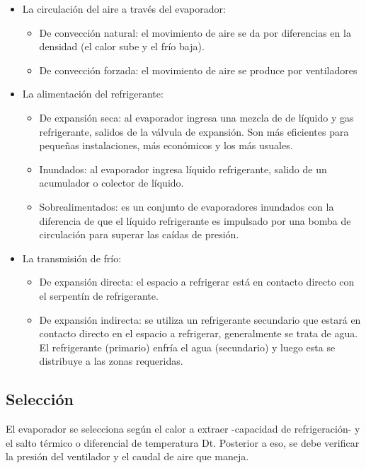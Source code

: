 \begin{itemize}
\item La circulación del aire a través del evaporador:\begin{itemize}
    \item De convección natural: el movimiento de aire se da por diferencias en la densidad (el calor sube y el frío baja).
    \item De convección forzada: el movimiento de aire se produce por ventiladores
    \end{itemize}
\item La alimentación del refrigerante:\begin{itemize}
    \item De expansión seca: al evaporador ingresa una mezcla de de líquido y gas refrigerante, salidos de la válvula de expansión. Son más eficientes para pequeñas instalaciones, más económicos y los más usuales.
    \item Inundados: al evaporador ingresa líquido refrigerante, salido de un acumulador o colector de líquido.
    \item Sobrealimentados: es un conjunto de evaporadores inundados con la diferencia de que el líquido refrigerante es impulsado por una bomba de circulación para superar las caídas de presión.
\end{itemize}
\item La transmisión de frío:\begin{itemize}
    \item De expansión directa: el espacio a refrigerar está en contacto directo con el serpentín de refrigerante.
    \item De expansión indirecta: se utiliza un refrigerante secundario que estará en contacto directo en el espacio a refrigerar, generalmente se trata de agua. El refrigerante (primario) enfría el agua (secundario) y luego esta se distribuye a las zonas requeridas.
\end{itemize}
\end{itemize}

\subsection{Selección}

El evaporador se selecciona según el calor a extraer -capacidad de refrigeración- y el salto térmico o diferencial de temperatura Dt. Posterior a eso, se debe verificar la presión del ventilador y el caudal de aire que maneja.

